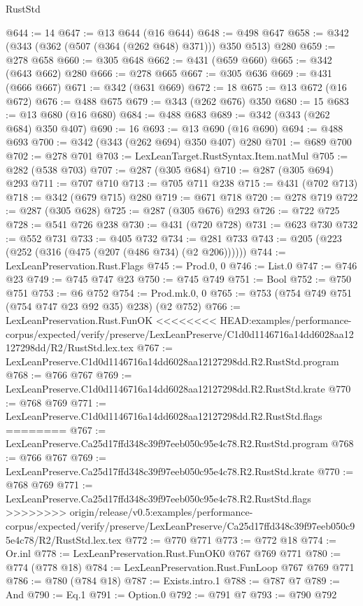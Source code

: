 \begin{lexlean}{RustStd}
\begin{coremodule}
{\begin{coremodule}
{{{{{{{@644 := 14
@647 := @13 @644 (@16 @644)
@648 := @498 @647
@658 := @342 (@343 (@362 (@507 (@364 (@262 @648) @371))) @350 @513) @280
@659 := @278 @658
@660 := @305 @648
@662 := @431 (@659 @660)
@665 := @342 (@643 @662) @280
@666 := @278 @665
@667 := @305 @636
@669 := @431 (@666 @667)
@671 := @342 (@631 @669)
@672 := 18
@675 := @13 @672 (@16 @672)
@676 := @488 @675
@679 := @343 (@262 @676) @350
@680 := 15
@683 := @13 @680 (@16 @680)
@684 := @488 @683
@689 := @342 (@343 (@262 @684) @350 @407)
@690 := 16
@693 := @13 @690 (@16 @690)
@694 := @488 @693
@700 := @342 (@343 (@262 @694) @350 @407) @280
@701 := @689 @700
@702 := @278 @701
@703 := LexLeanTarget.RustSyntax.Item.natMul
@705 := @282 (@538 @703)
@707 := @287 (@305 @684)
@710 := @287 (@305 @694) @293
@711 := @707 @710
@713 := @705 @711 @238
@715 := @431 (@702 @713)
@718 := @342 (@679 @715) @280
@719 := @671 @718
@720 := @278 @719
@722 := @287 (@305 @628)
@725 := @287 (@305 @676) @293
@726 := @722 @725
@728 := @541 @726 @238
@730 := @431 (@720 @728)
@731 := @623 @730
@732 := @552 @731
@733 := @405 @732
@734 := @281 @733
@743 := @205 (@223 (@252 (@316 (@475 (@207 (@486 @734) (@2 @206))))))
@744 := LexLeanPreservation.Rust.Flags
@745 := Prod.{0, 0}
@746 := List.{0}
@747 := @746 @23
@749 := @745 @747 @23
@750 := @745 @749
@751 := Bool
@752 := @750 @751
@753 := @6 @752
@754 := Prod.mk.{0, 0}
@765 := @753 (@754 @749 @751 (@754 @747 @23 @92 @35) @238) (@2 @752)
@766 := LexLeanPreservation.Rust.FunOK
<<<<<<<< HEAD:examples/performance-corpus/expected/verify/preserve/LexLeanPreserve/C1d0d1146716a14dd6028aa12127298dd/R2/RustStd.lex.tex
@767 := LexLeanPreserve.C1d0d1146716a14dd6028aa12127298dd.R2.RustStd.program
@768 := @766 @767
@769 := LexLeanPreserve.C1d0d1146716a14dd6028aa12127298dd.R2.RustStd.krate
@770 := @768 @769
@771 := LexLeanPreserve.C1d0d1146716a14dd6028aa12127298dd.R2.RustStd.flags
========
@767 := LexLeanPreserve.Ca25d17ffd348c39f97eeb050c95e4c78.R2.RustStd.program
@768 := @766 @767
@769 := LexLeanPreserve.Ca25d17ffd348c39f97eeb050c95e4c78.R2.RustStd.krate
@770 := @768 @769
@771 := LexLeanPreserve.Ca25d17ffd348c39f97eeb050c95e4c78.R2.RustStd.flags
>>>>>>>> origin/release/v0.5:examples/performance-corpus/expected/verify/preserve/LexLeanPreserve/Ca25d17ffd348c39f97eeb050c95e4c78/R2/RustStd.lex.tex
@772 := @770 @771
@773 := @772 @18
@774 := Or.inl
@778 := LexLeanPreservation.Rust.FunOK0 @767 @769 @771
@780 := @774 (@778 @18)
@784 := LexLeanPreservation.Rust.FunLoop @767 @769 @771
@786 := @780 (@784 @18)
@787 := Exists.intro.{1}
@788 := @787 @7
@789 := And
@790 := Eq.{1}
@791 := Option.{0}
@792 := @791 @7
@793 := @790 @792
}}}}}}}
\end{coremodule}}
\end{coremodule}
\end{lexlean}

